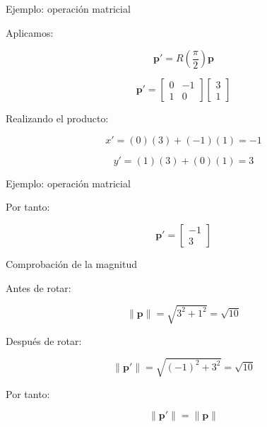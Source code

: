 \documentclass[aspectratio=169]{beamer}
\begin{document}
\begin{frame}{Ejemplo: operación matricial}

    Aplicamos:

    \[
    \mathbf{p}'
    =
    R\left(\frac{\pi}{2}\right)\mathbf{p}
    \]

    \[
    \mathbf{p}'
    =
    \begin{bmatrix}
        0 & -1\\
        1 & 0
    \end{bmatrix}
    \begin{bmatrix}
        3\\
        1
    \end{bmatrix}
    \]

    Realizando el producto:

    \[
    x'
    =
    (0)(3)+(-1)(1)
    =
    -1
    \]

    \[
    y'
    =
    (1)(3)+(0)(1)
    =
    3
    \]

\end{frame}

\begin{frame}{Ejemplo: operación matricial}

    Por tanto:

    \[
    \boxed{
        \mathbf{p}'
        =
        \begin{bmatrix}
            -1\\
            3
    \end{bmatrix}}
    \]

    \vspace{0.4cm}


\end{frame}

\begin{frame}{Comprobación de la magnitud}

    Antes de rotar:

    \[
    \|\mathbf{p}\|
    =
    \sqrt{3^2+1^2}
    =
    \sqrt{10}
    \]

    Después de rotar:

    \[
    \|\mathbf{p}'\|
    =
    \sqrt{(-1)^2+3^2}
    =
    \sqrt{10}
    \]

    Por tanto:

    \[
    \boxed{
        \|\mathbf{p}'\|=\|\mathbf{p}\|
    }
    \]

\end{frame}
\end{document}
